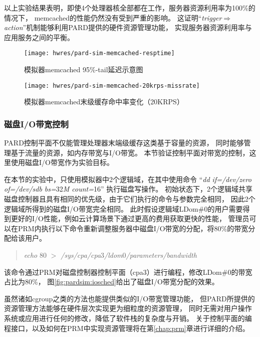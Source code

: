 以上实验结果表明，即使4个处理器核全部都在工作，服务器资源利用率为100\%的情况下，
memcached的性能仍然没有受到严重的影响。
这证明``\emph{trigger$\Rightarrow$action}''机制能够利用PARD提供的硬件资源管理功能，
实现服务器资源利用率与应用服务之间的平衡。

\begin{figure}[tb]
\begin{minipage}{0.48\textwidth}
  \centering
  \texttt{[image: hwres/pard-sim-memcached-resptime]}
  \caption{模拟器memcached 95\%-tail延迟示意图}
  \label{fig:pardsim:memcached-resptime}
\end{minipage}\hfill
\begin{minipage}{0.48\textwidth}
  \centering
  \texttt{[image: hwres/pard-sim-memcached-20krps-missrate]}
  \caption{模拟器memcached末级缓存命中率变化（20KRPS）}
  \label{fig:pardsim:memcached-20krps-missrate}
\end{minipage}
\end{figure}


\subsubsection{磁盘I/O带宽控制}

PARD控制平面不仅能管理处理器末端级缓存这类基于容量的资源，
同时能够管理基于流量的资源，如内存带宽与I/O带宽。
本节验证控制平面对带宽的控制，这里使用磁盘I/O带宽作为实验目标。

在本节的实验中，只使用模拟器中2个逻辑域，在其中使用命令
``\textit{dd if=/dev/zero of=/dev/sdb bs=}32\textit{M count=}16''
执行磁盘写操作。
初始状态下，2个逻辑域共享磁盘控制器且具有相同的优先级，由于它们执行的命令与参数完全相同，
因此2个逻辑域所得到的磁盘I/O带宽完全相同。
此时假设逻辑域LDom\#0的用户需要得到更好的I/O性能，例如云计算场景下通过更高的费用获取更快的性能，
管理员可以在PRM内执行以下命令重新调整服务器中磁盘I/O带宽的分配，将80\%的带宽分配给该用户。
\begin{verse}
\textit{echo} 80 \textit{$>$ /sys/cpa/cpa}3\textit{/ldom}0\textit{/parameters/bandwidth}
\end{verse}

该命令通过PRM对磁盘控制器控制平面（cpa3）进行编程，修改LDom\#0的带宽占比为80\%，
图\ref{fig:pardsim:iosched}给出了磁盘I/O带宽分配的效果。

虽然诸如cgroup\cite{cgroup}之类的方法也能提供类似的I/O带宽管理功能，
但PARD所提供的资源管理方法能够在硬件层次实现更为细粒度的资源管理，
同时无需对用户操作系统或应用进行任何的修改，降低了软件栈的复杂度与开销。
关于控制平面的编程接口，以及如何在PRM中实现资源管理将在第\ref{chap:prm}章进行详细的介绍。

